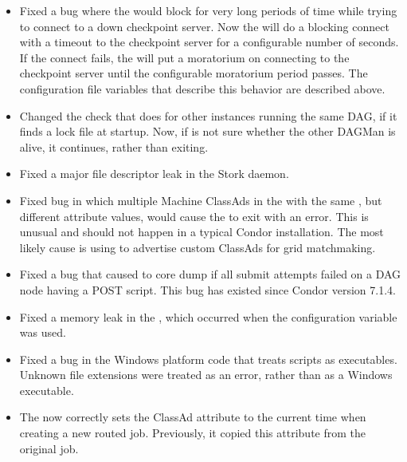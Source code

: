 \begin{itemize}

\item Fixed a bug where the  would block for very long
periods of time while trying to connect to a down checkpoint server. Now
the  will do a blocking connect with a timeout to the
checkpoint server for a configurable number of seconds. If the connect
fails, the  will put a moratorium on connecting to the
checkpoint server until the configurable moratorium period passes. The
configuration file variables that describe this behavior are described
above.

\item Changed the check that  does for other
 instances
running the same DAG, if it finds a lock file at startup.
Now, if  is not sure whether the other DAGMan is alive,
it continues, rather than exiting.

\item Fixed a major file descriptor leak in the Stork daemon.

\item Fixed bug in which multiple Machine ClassAds in the
 with the same ,
but different  attribute values,
would cause the  to exit with an error.
This is unusual and should not happen in a typical Condor installation.
The most likely cause is using 
to advertise custom ClassAds for grid matchmaking.

\item Fixed a bug that caused  to core dump if all
submit attempts failed on a DAG node having a POST script.
This bug has existed since Condor version 7.1.4.

\item Fixed a memory leak in the , which occurred when
the configuration variable  was used.

\item Fixed a bug in the Windows platform code that treats scripts as
  executables.
  Unknown file extensions were treated as an error,
  rather than as a Windows executable.

\item The  now correctly sets the ClassAd attribute
 to the current time when creating a new routed job.
Previously, it copied this attribute from the original job.


\end{itemize}

